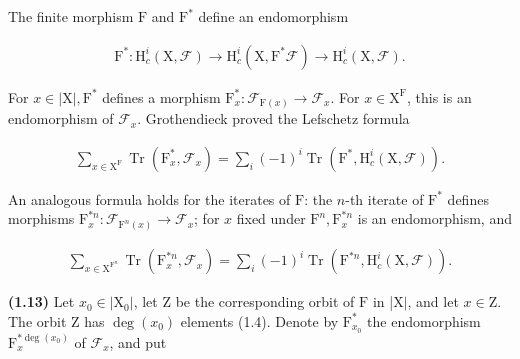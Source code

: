 \documentclass[10pt,leqno]{article}
\begin{document}
\noindent The finite morphism \(\mathrm{F}\) and \(\mathrm{F}^{*}\) define an endomorphism\par

\begin{equation*}\begin{gathered}\mathrm{F}^{*} : \mathrm{H}_{c}^{i}(\mathrm{X},\mathcal{F} ) \longrightarrow  \mathrm{H}_{c}^{i}(\mathrm{X},\mathrm{F}^{*}\mathcal{F} ) \longrightarrow  \mathrm{H}_{c}^{i}(\mathrm{X},\mathcal{F} ).\end{gathered}\end{equation*}

\noindent For \(x\in |\mathrm{X}|, \mathrm{F}^{*}\) defines a morphism \(\mathrm{F}_{x}^{*}:\mathcal{F} _{\mathrm{F}(x)}\longrightarrow \mathcal{F} _{x}\). For \(x\in \mathrm{X}^{\mathrm{F}}\), this is an endomorphism of \(\mathcal{F} _{x}\). Grothendieck proved the Lefschetz formula\par

\begin{equation*}\begin{gathered}\sum _{x\in \mathrm{X}^{\mathrm{F}}} \operatorname{Tr}(\mathrm{F}_{x}^{*},\mathcal{F} _{x}) = \sum _{i} (- 1)^{i} \operatorname{Tr}(\mathrm{F}^{*},\mathrm{H}_{c}^{i}(\mathrm{X},\mathcal{F} )).\end{gathered}\end{equation*}

\noindent An analogous formula holds for the iterates of \(\mathrm{F}\): the \(n\)-th iterate of \(\mathrm{F}^{*}\) defines morphisms \(\mathrm{F}_{x}^{*n}:\mathcal{F} _{\mathrm{F}^{n}(x)}\longrightarrow \mathcal{F} _{x}\); for \(x\) fixed under \(\mathrm{F}^{n}, \mathrm{F}_{x}^{*n}\) is an endomorphism, and\par

\begin{equation*}\begin{gathered}\sum _{x\in \mathrm{X}^{\mathrm{F}^{n}}} \operatorname{Tr}(\mathrm{F}_{x}^{*n},\mathcal{F} _{x}) = \sum _{i} (- 1)^{i} \operatorname{Tr}(\mathrm{F}^{*n},\mathrm{H}_{c}^{i}(\mathrm{X},\mathcal{F} )).\end{gathered}\tag{1.12.1}\end{equation*}

\noindent \textbf{(1.13)} Let \(x_{0}\in |\mathrm{X}_{0}|\), let \(\mathrm{Z}\) be the corresponding orbit of \(\mathrm{F}\) in |\(\mathrm{X}|\), and let \(x\in \mathrm{Z}\). The orbit \(\mathrm{Z}\) has \(\operatorname{deg}(x_{0})\) elements (1.4). Denote by \(\mathrm{F}_{x_{0}}^{*}\) the endomorphism \(\mathrm{F}_{x}^{*\operatorname{deg}(x_{0})}\) of \(\mathcal{F} _{x}\), and put\par
\end{document}
